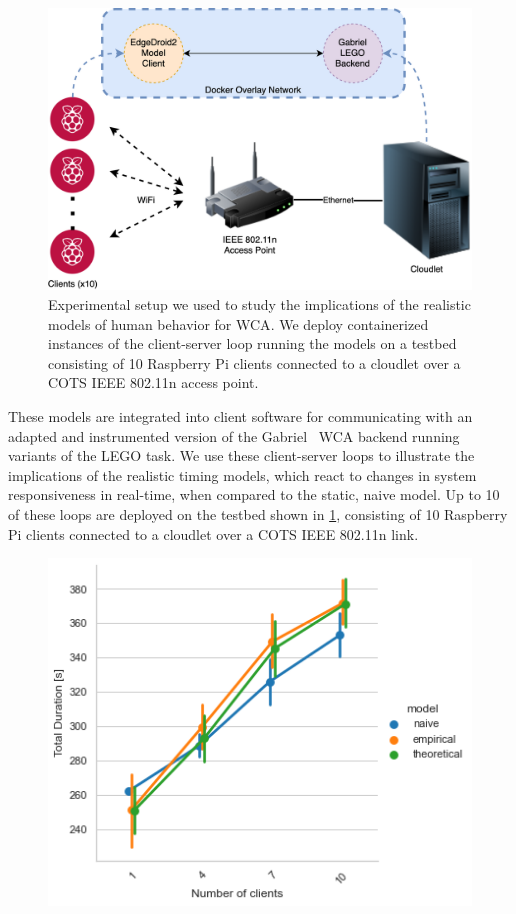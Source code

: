 \begin{figure}
    \centering
    \includegraphics[width=\columnwidth]{figs/EdgeDroid2ExperimentalSetup.png}
    \caption{%
        Experimental setup we used to study the implications of the realistic models of human behavior for \ac{WCA}.
        We deploy containerized instances of the client-server loop running the models on a testbed consisting of \num{10} Raspberry Pi clients connected to a cloudlet over a \ac{COTS} \acs{IEEE} \num{802.11}n access point.
    }\label{fig:expsetup}
\end{figure}


These models are integrated into client software for communicating with an adapted and instrumented version of the Gabriel~\cite{Chen2015LEGO,Chen2018application} \ac{WCA} backend running variants of the LEGO task.
We use these client-server loops to illustrate the implications of the realistic timing models, which react to changes in system responsiveness in real-time, when compared to the static, naive model.
Up to \num{10} of these loops are deployed on the testbed shown in \cref{fig:expsetup}, consisting of \num{10} Raspberry Pi clients connected to a cloudlet over a \ac{COTS} \acs{IEEE} \num{802.11}n link.

\begin{figure}
    \centering
    \includegraphics[width=.8\columnwidth]{figs/numclients_vs_duration.png}
    \caption{}\label{fig:scaling_duration}
\end{figure}

